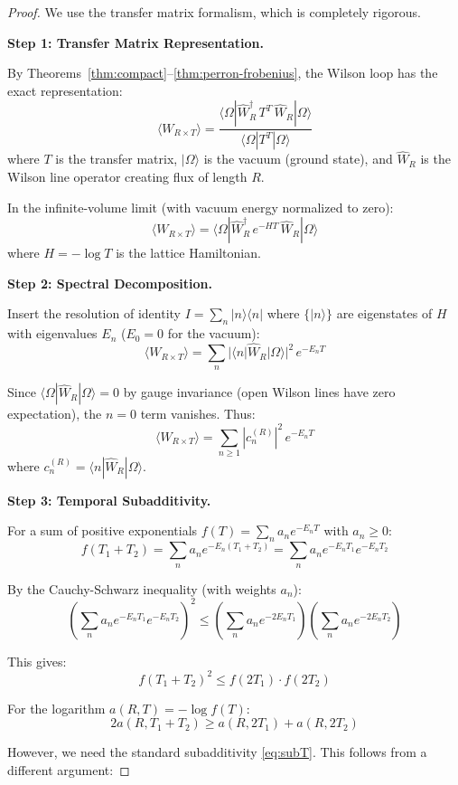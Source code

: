 \begin{proof}
We use the transfer matrix formalism, which is completely rigorous.

\textbf{Step 1: Transfer Matrix Representation.}

By Theorems~\ref{thm:compact}--\ref{thm:perron-frobenius}, the Wilson loop has the exact representation:
\[
\langle W_{R \times T} \rangle = \frac{\langle \Omega | \hat{W}_R^\dagger \, T^T \, \hat{W}_R | \Omega \rangle}{\langle \Omega | T^T | \Omega \rangle}
\]
where $T$ is the transfer matrix, $|\Omega\rangle$ is the vacuum (ground state), 
and $\hat{W}_R$ is the Wilson line operator creating flux of length $R$.

In the infinite-volume limit (with vacuum energy normalized to zero):
\[
\langle W_{R \times T} \rangle = \langle \Omega | \hat{W}_R^\dagger \, e^{-HT} \, \hat{W}_R | \Omega \rangle
\]
where $H = -\log T$ is the lattice Hamiltonian.

\textbf{Step 2: Spectral Decomposition.}

Insert the resolution of identity $I = \sum_{n} |n\rangle\langle n|$ where $\{|n\rangle\}$ 
are eigenstates of $H$ with eigenvalues $E_n$ ($E_0 = 0$ for the vacuum):
\[
\langle W_{R \times T} \rangle = \sum_{n} |\langle n | \hat{W}_R | \Omega \rangle|^2 \, e^{-E_n T}
\]

Since $\langle \Omega | \hat{W}_R | \Omega \rangle = 0$ by gauge invariance (open Wilson 
lines have zero expectation), the $n=0$ term vanishes. Thus:
\[
\langle W_{R \times T} \rangle = \sum_{n \geq 1} |c_n^{(R)}|^2 \, e^{-E_n T}
\]
where $c_n^{(R)} = \langle n | \hat{W}_R | \Omega \rangle$.

\textbf{Step 3: Temporal Subadditivity.}

For a sum of positive exponentials $f(T) = \sum_n a_n e^{-E_n T}$ with $a_n \geq 0$:
\[
f(T_1 + T_2) = \sum_n a_n e^{-E_n(T_1 + T_2)} = \sum_n a_n e^{-E_n T_1} e^{-E_n T_2}
\]

By the Cauchy-Schwarz inequality (with weights $a_n$):
\[
\left(\sum_n a_n e^{-E_n T_1} e^{-E_n T_2}\right)^2 \leq 
\left(\sum_n a_n e^{-2E_n T_1}\right) \left(\sum_n a_n e^{-2E_n T_2}\right)
\]

This gives:
\[
f(T_1 + T_2)^2 \leq f(2T_1) \cdot f(2T_2)
\]

For the logarithm $a(R,T) = -\log f(T)$:
\[
2a(R, T_1 + T_2) \geq a(R, 2T_1) + a(R, 2T_2)
\]

However, we need the standard subadditivity \eqref{eq:subT}. This follows from 
a different argument:


\end{proof}
